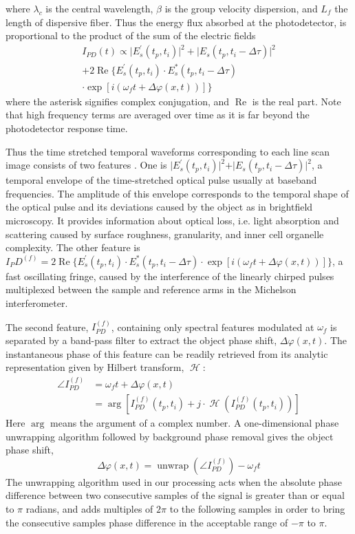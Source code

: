 \documentclass[aps,pra,reprint,superscriptaddress]{revtex4-1}
\DeclareMathOperator{\hilbert}{\mathcal{H}} %
\DeclareMathOperator{\unwrap}{unwrap} %
\begin{document}
where $\lambda_c$ is the central wavelength, $\beta$ is the group velocity dispersion, and $L_f$ the length of dispersive fiber. Thus the energy flux absorbed at the photodetector, is proportional to the product of the sum of the electric fields
\begin{multline}
I_{PD}(t) \propto \lvert E_s^\prime(t_p,t_i) \rvert^2 + \lvert E_s(t_p,t_i-\Delta\tau) \rvert^2\\
+ 2 \operatorname{Re}\lbrace E_s^\prime(t_p,t_i) \cdot E_s^*(t_p,t_i-\Delta\tau)\\
\cdot \exp[i(\omega_f t + \Delta\varphi(x,t))] \rbrace
\end{multline}
where the asterisk signifies complex conjugation, and $\operatorname{Re}$ is the real part. Note that high frequency terms are averaged over time as it is far beyond the photodetector response time. 

Thus the time stretched temporal waveforms corresponding to each line scan image consists of two features \cite{mahjoubfar2014label}. One is $\rvert E_s^\prime(t_p,t_i) \lvert^2 + \rvert E_s(t_p,t_i-\Delta\tau) \lvert^2$, a temporal envelope of the time-stretched optical pulse usually at baseband frequencies. The amplitude of this envelope corresponds to the temporal shape of the optical pulse and its deviations caused by the object as in brightfield microscopy. It provides information about optical loss, i.e. light absorption and scattering caused by surface roughness, granularity, and inner cell organelle complexity. The other feature is $I_PD^{(f)} = 2 \operatorname{Re}\lbrace E_s^\prime(t_p,t_i) \cdot E_s^*(t_p,t_i-\Delta\tau) \cdot \exp[i(\omega_f t + \Delta\varphi(x,t))] \rbrace$, a fast oscillating fringe, caused by the interference of the linearly chirped pulses multiplexed between the sample and reference arms in the Michelson interferometer.

The second feature, $I_{PD}^{(f)}$, containing only spectral features modulated at $\omega_f$ is separated by a band-pass filter to extract the object phase shift, $\Delta\varphi(x,t)$. The instantaneous phase of this feature can be readily retrieved from its analytic representation given by Hilbert transform, $\hilbert$:
\begin{align}
\angle I_{PD}^{(f)} &= \omega_f t + \Delta\varphi(x,t) \\
&= \arg[I_{PD}^{(f)} (t_p,t_i ) + j \cdot \hilbert(I_{PD}^{(f)}(t_p,t_i))]
\end{align}
Here $\arg$ means the argument of a complex number. A one-dimensional phase unwrapping algorithm followed by background phase removal gives the object phase shift, 
\begin{equation}
\Delta\varphi(x,t) = \unwrap(\angle I_{PD}^{(f)}) - \omega_f t
\end{equation}
The unwrapping algorithm used in our processing acts when the absolute phase difference between two consecutive samples of the signal is greater than or equal to $\pi$ radians, and adds multiples of $2\pi$ to the following samples in order to bring the consecutive samples phase difference in the acceptable range of $-\pi$ to $\pi$.
\end{document}
